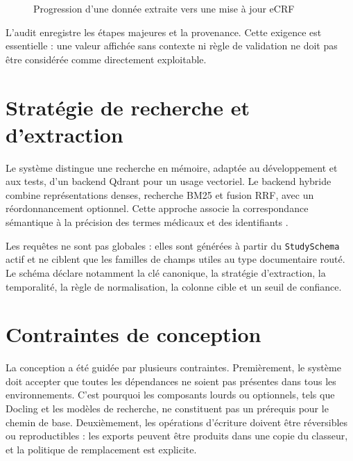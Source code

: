 \begin{figure}[H]
\centering
{}
\caption{Progression d'une donnée extraite vers une mise à jour eCRF}
\end{figure}

L'audit enregistre les étapes majeures et la provenance. Cette exigence est essentielle : une valeur affichée sans contexte ni règle de validation ne doit pas être considérée comme directement exploitable.

\section{Stratégie de recherche et d'extraction}
Le système distingue une recherche en mémoire, adaptée au développement et aux tests, d'un backend Qdrant pour un usage vectoriel. Le backend hybride combine représentations denses, recherche BM25 et fusion RRF, avec un réordonnancement optionnel. Cette approche associe la correspondance sémantique à la précision des termes médicaux et des identifiants \cite{qdrant-hybrid}.

Les requêtes ne sont pas globales : elles sont générées à partir du \texttt{StudySchema} actif et ne ciblent que les familles de champs utiles au type documentaire routé. Le schéma déclare notamment la clé canonique, la stratégie d'extraction, la temporalité, la règle de normalisation, la colonne cible et un seuil de confiance.

\section{Contraintes de conception}
La conception a été guidée par plusieurs contraintes. Premièrement, le système doit accepter que toutes les dépendances ne soient pas présentes dans tous les environnements. C'est pourquoi les composants lourds ou optionnels, tels que Docling et les modèles de recherche, ne constituent pas un prérequis pour le chemin de base. Deuxièmement, les opérations d'écriture doivent être réversibles ou reproductibles : les exports peuvent être produits dans une copie du classeur, et la politique de remplacement est explicite.

